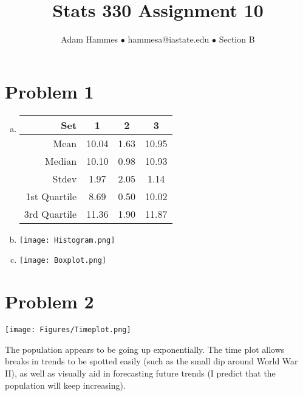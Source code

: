 \documentclass[11pt]{article}
\begin{document}
\title{\vspace{-8ex}Stats 330 Assignment 10}
\author{Adam Hammes $\bullet$ hammesa@iastate.edu $\bullet$ Section B}
\maketitle


\section*{Problem 1}

\begin{enumerate}[(a)]
\item
	\begin{tabular}{ r | c | c | c}
		Set & 1 & 2 & 3 \\
		\hline
		Mean & 10.04 & 1.63 & 10.95 \\
		\hline
		Median & 10.10 & 0.98 & 10.93 \\
		\hline
		Stdev & 1.97 & 2.05 & 1.14 \\
		\hline
		1st Quartile & 8.69 & 0.50 & 10.02 \\
		\hline
		3rd Quartile & 11.36 & 1.90 & 11.87
	\end{tabular}

\item {} {
	\texttt{[image: Histogram.png]}
	}

\item {} {
	\texttt{[image: Boxplot.png]}
	}

\end{enumerate}


\section*{Problem 2}

\texttt{[image: Figures/Timeplot.png]}

The population appears to be going up exponentially. The time plot allows breaks in trends to be spotted easily (such as the small dip around World War II), as well as visually aid in forecasting future trends (I predict that the population will keep increasing).
\end{document}
